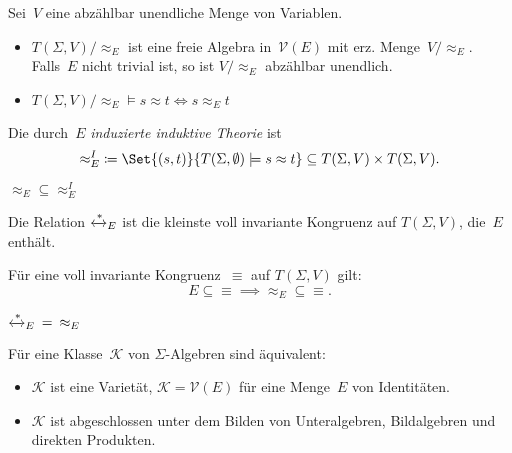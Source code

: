 \documentclass{cheat-sheet}
\newcommand{\zzEq}{\xleftrightarrow{*}} %
\newcommand{\ident}{\approx} %
\newcommand{\Variety}{\mathcal{V}} %
\begin{document}
\begin{thm}
  Sei~$V$ eine abzählbar unendliche Menge von Variablen.
  \begin{itemize}
    \item $T(\Sigma, V)/{\ident_E}$ ist eine freie Algebra in~$\Variety(E)$ mit erz. Menge~$V/{\ident_E}$. Falls~$E$ nicht trivial ist, so ist $V/{\ident_E}$ abzählbar unendlich.
    \item $T(\Sigma, V)/{\ident_E} \models s \ident t \iff s \ident_E t$
  \end{itemize}
\end{thm}


\begin{defn}
  Die durch~$E$ \emph{induzierte induktive Theorie} ist
  \[
    {\ident_E^I} \coloneqq \Set{(s, t)}{T(\Sigma, \emptyset) \models s \ident t} \subseteq T(\Sigma, V) \times T(\Sigma, V).
  \]
\end{defn}

\begin{bem}
  ${\ident_E} \subseteq {\ident_E^I}$
\end{bem}


\begin{umformulierung}
  Die Relation $\zzEq_E$ ist die kleinste voll invariante Kongruenz auf $T(\Sigma, V)$, die~$E$ enthält.
\end{umformulierung}

\begin{lem}
  Für eine voll invariante Kongruenz~$\equiv$ auf $T(\Sigma, V)$ gilt:
  \[ E \subseteq {\equiv} \implies {\ident_E} \subseteq {\equiv}. \]
\end{lem}

\begin{kor}
  $\zzEq_E \enspace = \enspace \ident_E$
\end{kor}

\begin{thm}
  Für eine Klasse~$\mathcal{K}$ von $\Sigma$-Algebren sind äquivalent:
  \begin{itemize}
    \item $\mathcal{K}$ ist eine Varietät, \dh{} $\mathcal{K} = \Variety(E)$ für eine Menge~$E$ von Identitäten.
    \item $\mathcal{K}$ ist abgeschlossen unter dem Bilden von Unteralgebren, Bildalgebren und direkten Produkten.
  \end{itemize}
\end{thm}
\end{document}
